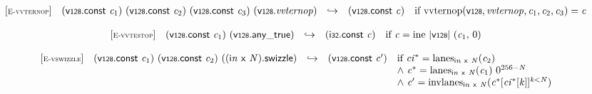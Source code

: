 \vspace{1ex}

$$
\begin{array}{@{}l@{}lcl@{}l@{}}
{[\textsc{\scriptsize E{-}vvternop}]} \quad & (\mathsf{v{\scriptstyle128}}.\mathsf{const}~{\mathit{c}}_{{1}})~(\mathsf{v{\scriptstyle128}}.\mathsf{const}~{\mathit{c}}_{{2}})~(\mathsf{v{\scriptstyle128}}.\mathsf{const}~{\mathit{c}}_{{3}})~(\mathsf{v{\scriptstyle128}} . {\mathit{vvternop}}) &\hookrightarrow& (\mathsf{v{\scriptstyle128}}.\mathsf{const}~{\mathit{c}}) &\quad
  \mbox{if}~{\mathrm{vvternop}}(\mathsf{v{\scriptstyle128}}, {\mathit{vvternop}}, {\mathit{c}}_{{1}}, {\mathit{c}}_{{2}}, {\mathit{c}}_{{3}}) = {\mathit{c}} \\
\end{array}
$$

\vspace{1ex}

$$
\begin{array}{@{}l@{}lcl@{}l@{}}
{[\textsc{\scriptsize E{-}vvtestop}]} \quad & (\mathsf{v{\scriptstyle128}}.\mathsf{const}~{\mathit{c}}_{{1}})~(\mathsf{v{\scriptstyle128}} . \mathsf{any\_true}) &\hookrightarrow& (\mathsf{i{\scriptstyle32}}.\mathsf{const}~{\mathit{c}}) &\quad
  \mbox{if}~{\mathit{c}} = {\mathrm{ine}}~{|\mathsf{v{\scriptstyle128}}|}~({\mathit{c}}_{{1}},\, 0) \\
\end{array}
$$

\vspace{1ex}

$$
\begin{array}{@{}l@{}lcl@{}l@{}}
{[\textsc{\scriptsize E{-}vswizzle}]} \quad & (\mathsf{v{\scriptstyle128}}.\mathsf{const}~{\mathit{c}}_{{1}})~(\mathsf{v{\scriptstyle128}}.\mathsf{const}~{\mathit{c}}_{{2}})~(({\mathsf{i}}{{\mathit{n}}}~\mathsf{x}~{\mathit{N}}).\mathsf{swizzle}) &\hookrightarrow& (\mathsf{v{\scriptstyle128}}.\mathsf{const}~{\mathit{c}'}) &\quad
  \mbox{if}~{{\mathit{ci}}^\ast} = {{\mathrm{lanes}}}_{{\mathsf{i}}{{\mathit{n}}}~\mathsf{x}~{\mathit{N}}}({\mathit{c}}_{{2}}) \\
 &&&&\quad {\land}~{{\mathit{c}}^\ast} = {{\mathrm{lanes}}}_{{\mathsf{i}}{{\mathit{n}}}~\mathsf{x}~{\mathit{N}}}({\mathit{c}}_{{1}})~{0^{256 - {\mathit{N}}}} \\
 &&&&\quad {\land}~{\mathit{c}'} = {{\mathrm{invlanes}}}_{{\mathsf{i}}{{\mathit{n}}}~\mathsf{x}~{\mathit{N}}}({{{\mathit{c}}^\ast}{}[{{\mathit{ci}}^\ast}{}[{\mathit{k}}]]^{{\mathit{k}}<{\mathit{N}}}}) \\
\end{array}
$$

